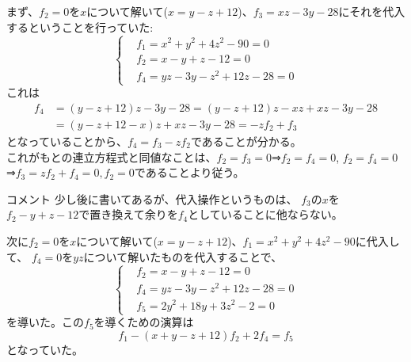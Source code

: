 \begin{frame}
	まず、$f_2=0$を$x$について解いて($x=y-z+12$)、$f_3=xz-3y-28$にそれを代入するということを行っていた:
	\begin{equation*}
		\left\{
		\begin{aligned}
			 & f_1=x^2+y^2+4z^2-90=0  \\
			 & f_2=x-y+z-12=0         \\
			 & f_4=yz-3y-z^2+12z-28=0
		\end{aligned}
		\right.
	\end{equation*}
	これは
	\begin{align*}
		f_4 & =(y-z+12)z-3y-28 = (y-z+12)z -xz +xz -3y-28 \\
		    & =(y-z+12-x)z+xz-3y-28=-zf_2+f_3
	\end{align*}
	となっていることから、$f_4=f_3-zf_2$であることが分かる。\\
	これがもとの連立方程式と同値なことは、$f_2=f_3=0$⇒$f_2=f_4=0$, $f_2=f_4=0$⇒$f_3=zf_2+f_4=0, f_2=0$であることより従う。
	\begin{block}{コメント}
		少し後に書いてあるが、代入操作というものは、
		$f_3$の$x$を$f_2-y+z-12$で置き換えて余りを$f_4$としていることに他ならない。
	\end{block}

\end{frame}

\begin{frame}
	次に$f_2=0$を$x$について解いて($x=y-z+12$)、$f_1=x^2+y^2+4z^2-90$に代入して、
	$f_4=0$を$yz$について解いたものを代入することで、
	\begin{equation*}
		\left\{
		\begin{aligned}
			 & f_2=x-y+z-12=0         \\
			 & f_4=yz-3y-z^2+12z-28=0 \\
			 & f_5=2y^2+18y+3z^2-2=0
		\end{aligned}
		\right.
	\end{equation*}
	を導いた。この$f_5$を導くための演算は
	\begin{equation*}
		f_1-(x+y-z+12)f_2+2f_4=f_5
	\end{equation*}
	となっていた。
\end{frame}

